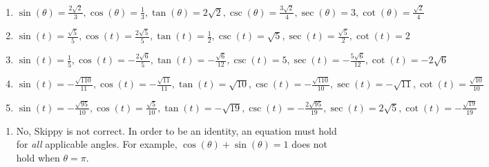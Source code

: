 \begin{enumerate}
\item $\sin(\theta) = \frac{2\sqrt{2}}{3}, \cos(\theta) = \frac{1}{3}, \tan(\theta) = 2\sqrt{2}, \csc(\theta) = \frac{3\sqrt{2}}{4}, \sec(\theta) = 3, \cot(\theta) = \frac{\sqrt{2}}{4}$

\item $\sin(t) = \frac{\sqrt{5}}{5}, \cos(t) = \frac{2\sqrt{5}}{5}, \tan(t) = \frac{1}{2}, \csc(t) = \sqrt{5}, \sec(t) = \frac{\sqrt{5}}{2}, \cot(t) = 2$

\item $\sin(t) = \frac{1}{5}, \cos(t) = -\frac{2\sqrt{6}}{5}, \tan(t) = -\frac{\sqrt{6}}{12}, \csc(t) = 5, \sec(t) = -\frac{5\sqrt{6}}{12}, \cot(t) = -2\sqrt{6}$

\item $\sin(t) = -\frac{\sqrt{110}}{11}, \cos(t) = -\frac{\sqrt{11}}{11}, \tan(t) = \sqrt{10}, \csc(t) = -\frac{\sqrt{110}}{10}, \sec(t) = -\sqrt{11}, \cot(t) = \frac{\sqrt{10}}{10}$

\item $\sin(t) = -\frac{\sqrt{95}}{10}, \cos(t) = \frac{\sqrt{5}}{10}, \tan(t) = -\sqrt{19}, \csc(t) = -\frac{2\sqrt{95}}{19}, \sec(t) = 2\sqrt{5}, \cot(t) = -\frac{\sqrt{19}}{19}$

\setcounter{HW}{\value{enumi}}

\end{enumerate}

\begin{enumerate}
\setcounter{enumi}{\value{HW}}

\item No, Skippy is not correct.  In order to be an identity, an equation must hold for \textit{all} applicable angles.  For example,  $\cos(\theta) + \sin(\theta) = 1$ does not hold when $\theta = \pi$.  

\setcounter{HW}{\value{enumi}}
\end{enumerate}




